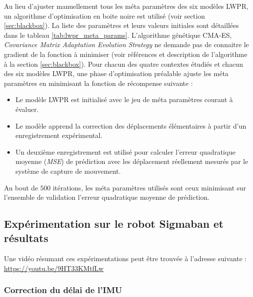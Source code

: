 Au lieu d'ajuster manuellement tous les méta paramètres des 
six modèles LWPR, un algorithme d'optimisation en boite noire est utilisé 
(voir section \ref{sec:blackbox}).
La liste des paramètres et leurs valeurs initiales sont détaillées 
dans le tableau \ref{tab:lwpr_meta_params}.
L'algorithme génétique CMA-ES, \textit{Covariance Matrix Adaptation Evolution Strategy} ne 
demande pas de connaitre le gradient de la fonction à minimiser
(voir références et description de l'algorithme à la section \ref{sec:blackbox}).
Pour chacun des quatre contextes étudiés et chacun des six modèles LWPR, 
une phase d'optimisation préalable ajuste les méta paramètres en minimisant 
la fonction de récompense suivante :
\begin{itemize}
    \item Le modèle LWPR est initialisé avec le jeu de méta paramètres courant à évaluer.
    \item Le modèle apprend la correction des déplacements élémentaires 
        à partir d'un enregistrement expérimental.
    \item Un deuxième enregistrement est utilisé pour calculer l'erreur quadratique 
        moyenne (\textit{MSE}) de prédiction avec les déplacement réellement 
        mesurés par le système de capture de mouvement.
\end{itemize}
Au bout de $500$ itérations, les méta paramètres utilisés sont ceux minimisant sur l'ensemble de
validation l'erreur quadratique moyenne de prédiction.

\subsection{Expérimentation sur le robot Sigmaban et résultats}

Une vidéo résumant ces expérimentations peut être trouvée 
à l'adresse suivante :
\url{https://youtu.be/9HT33KMtfLw}

\subsubsection{Correction du délai de l'IMU}

